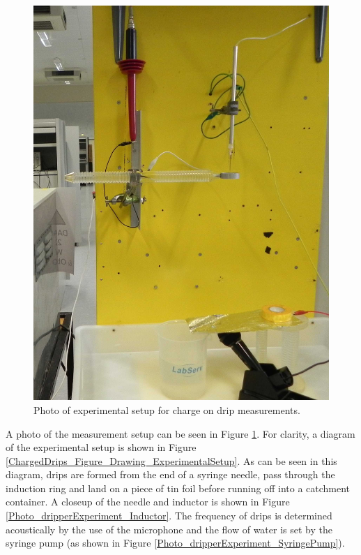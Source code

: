 \begin{figure}[H]
\begin{centering}
\includegraphics[scale=0.15]{content/appendices/chargedWaterDrops/graphics/Photo_dripperExperiment_Setup_draft.JPG}
\par\end{centering}

\centering{}\protect\caption{\label{Photo_dripperExperiment_Setup}Photo of experimental setup
for charge on drip measurements.}
\end{figure}


A photo of the measurement setup can be seen in Figure \ref{Photo_dripperExperiment_Setup}.
For clarity, a diagram of the experimental setup is shown in Figure
\ref{ChargedDrips_Figure_Drawing_ExperimentalSetup}. As can be seen
in this diagram, drips are formed from the end of a syringe needle,
pass through the induction ring and land on a piece of tin foil before
running off into a catchment container. A closeup of the needle and
inductor is shown in Figure \ref{Photo_dripperExperiment_Inductor}.
The frequency of drips is determined acoustically by the use of the
microphone and the flow of water is set by the syringe pump (as shown
in Figure \ref{Photo_dripperExperiment_SyringePump}).

